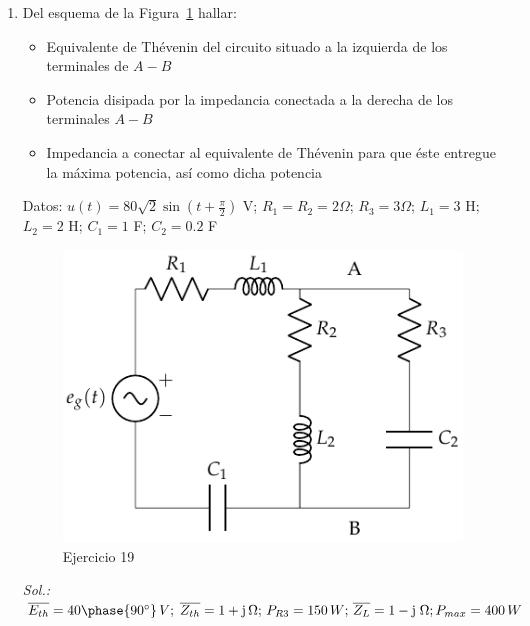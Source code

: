 \begin{enumerate}
\item Del esquema de la Figura~\ref{fig.ej19_BT2} hallar:
    \begin{itemize}
        \item Equivalente de Thévenin del circuito situado a la izquierda de los terminales de $A-B$ 
        \item Potencia disipada por la impedancia conectada a la derecha de los terminales $A-B$
        \item Impedancia a conectar al equivalente de Thévenin para que éste entregue la máxima potencia, así como dicha potencia
    \end{itemize}
    Datos: $u(t)=80\sqrt{2}\sin(t+\frac{\pi}{2})$ V;          $R_1=R_2=2\Omega$;          $R_3=3\Omega$;          $L_1=3$ H;         $L_2=2$ H;   $C_1=1$ F;            $C_2=0.2$ F
    \begin{figure}[H]
        \centering
        \includegraphics{../figs/ej19_BT2.pdf}
        \caption{Ejercicio 19}
        \label{fig.ej19_BT2}
    \end{figure}
    \emph{Sol.: $\overline{E_{th}}=40\phase{90^\circ}\,V;\;\overline{Z_{th}}=1+\mathrm{j}\,\Omega;\,P_{R3}=150\,W;\, \overline{Z_L} = 1-\mathrm{j} \;\Omega; P_{max} = 400\,W$}
    

\end{enumerate}
